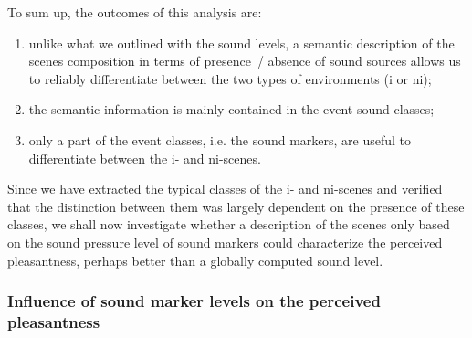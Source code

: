 \documentclass[12pt]{elsarticle}
\begin{document}
To sum up, the outcomes of this analysis are:

\begin{enumerate}
\item unlike what we outlined with the sound levels, a semantic description of the scenes composition in terms of presence~/ absence of sound sources allows us to reliably differentiate between the two types of environments (i or ni);
\item the semantic information is mainly contained in the event sound classes;
\item only a part of the event classes, i.e. the sound markers, are useful to differentiate between the i- and ni-scenes.
\end{enumerate}


Since we have extracted the typical classes of the i- and ni-scenes and verified that the distinction between them was largely dependent on the presence of these classes, we shall now investigate whether a description of the scenes only based on the sound pressure level of sound markers could characterize the perceived pleasantness, perhaps better than a globally computed sound level.

\subsubsection*{Influence of sound marker levels on the perceived pleasantness}
\end{document}
